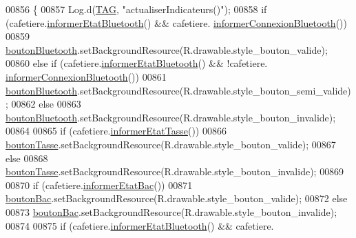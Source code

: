 \begin{DoxyCode}
00856     \{
00857         Log.d(\hyperlink{classcom_1_1example_1_1ekawa_1_1_ihm_a95cd92c2acaf9f8982302da08d94f9aa}{TAG}, \textcolor{stringliteral}{"actualiserIndicateurs()"});
00858         \textcolor{keywordflow}{if} (cafetiere.\hyperlink{classcom_1_1example_1_1ekawa_1_1_cafetiere_aeff88ad385713a7897074dcdb76077a5}{informerEtatBluetooth}() && cafetiere.
      \hyperlink{classcom_1_1example_1_1ekawa_1_1_cafetiere_a97d9ca4701a961fe8865ecfa1d5bf64a}{informerConnexionBluetooth}())
00859             \hyperlink{classcom_1_1example_1_1ekawa_1_1_ihm_a0c2ec4e1fa0085520fa9db31ee4284fc}{boutonBluetooth}.setBackgroundResource(R.drawable.style\_bouton\_valide);
00860         \textcolor{keywordflow}{else} \textcolor{keywordflow}{if} (cafetiere.\hyperlink{classcom_1_1example_1_1ekawa_1_1_cafetiere_aeff88ad385713a7897074dcdb76077a5}{informerEtatBluetooth}() && !cafetiere.
      \hyperlink{classcom_1_1example_1_1ekawa_1_1_cafetiere_a97d9ca4701a961fe8865ecfa1d5bf64a}{informerConnexionBluetooth}())
00861             \hyperlink{classcom_1_1example_1_1ekawa_1_1_ihm_a0c2ec4e1fa0085520fa9db31ee4284fc}{boutonBluetooth}.setBackgroundResource(R.drawable.style\_bouton\_semi\_valide);
00862         \textcolor{keywordflow}{else}
00863             \hyperlink{classcom_1_1example_1_1ekawa_1_1_ihm_a0c2ec4e1fa0085520fa9db31ee4284fc}{boutonBluetooth}.setBackgroundResource(R.drawable.style\_bouton\_invalide);
00864 
00865         \textcolor{keywordflow}{if} (cafetiere.\hyperlink{classcom_1_1example_1_1ekawa_1_1_cafetiere_ae3c04cc0258cbe554eee5894655c379e}{informerEtatTasse}())
00866             \hyperlink{classcom_1_1example_1_1ekawa_1_1_ihm_a32e7322f35858a93cdfb75e06f788842}{boutonTasse}.setBackgroundResource(R.drawable.style\_bouton\_valide);
00867         \textcolor{keywordflow}{else}
00868             \hyperlink{classcom_1_1example_1_1ekawa_1_1_ihm_a32e7322f35858a93cdfb75e06f788842}{boutonTasse}.setBackgroundResource(R.drawable.style\_bouton\_invalide);
00869 
00870         \textcolor{keywordflow}{if} (cafetiere.\hyperlink{classcom_1_1example_1_1ekawa_1_1_cafetiere_a1e5aad72cec77a755c8b70eb1be5e6e5}{informerEtatBac}())
00871             \hyperlink{classcom_1_1example_1_1ekawa_1_1_ihm_a6c4ca9f4166d4ceee1bee82b4f7508a4}{boutonBac}.setBackgroundResource(R.drawable.style\_bouton\_valide);
00872         \textcolor{keywordflow}{else}
00873             \hyperlink{classcom_1_1example_1_1ekawa_1_1_ihm_a6c4ca9f4166d4ceee1bee82b4f7508a4}{boutonBac}.setBackgroundResource(R.drawable.style\_bouton\_invalide);
00874 
00875         \textcolor{keywordflow}{if} (cafetiere.\hyperlink{classcom_1_1example_1_1ekawa_1_1_cafetiere_aeff88ad385713a7897074dcdb76077a5}{informerEtatBluetooth}() && cafetiere.

\end{DoxyCode}
